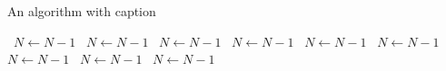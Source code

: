 \documentclass[a4paper]{article}
\begin{document}
\begin{algorithm}
\caption{An algorithm with caption}
\begin{algorithmic}
\    \State $N \gets N - 1$
\    \State $N \gets N - 1$
\    \State $N \gets N - 1$
\    \State $N \gets N - 1$
\    \State $N \gets N - 1$
\    \State $N \gets N - 1$
\    \State $N \gets N - 1$
\    \State $N \gets N - 1$
\    \State $N \gets N - 1$
\EndWhile
\end{algorithmic}
\end{algorithm}
\end{document}

